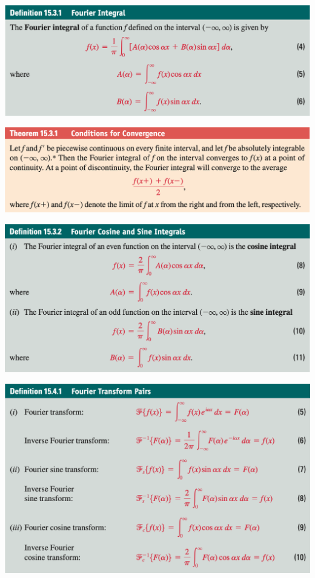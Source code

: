 \begin{center}
    \includegraphics[scale=0.4]{Imagenes/Screen Shot 2021-05-05 at 12.16.48.png}
\end{center}
\begin{center}
    \includegraphics[scale=0.4]{Imagenes/Screen Shot 2021-05-05 at 12.16.59.png}
\end{center}

\begin{center}
    \includegraphics[scale=0.4]{Imagenes/Screen Shot 2021-05-05 at 12.17.18.png}
\end{center}
\begin{center}
    \includegraphics[scale=0.4]{Imagenes/Screen Shot 2021-05-07 at 10.35.22.png}
\end{center}
